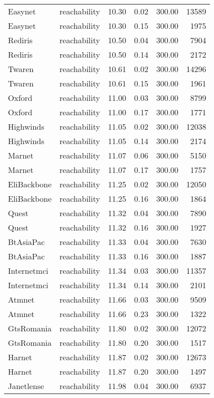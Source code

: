 \begin{tabular}{llrrrr}
Easynet & reachability & 10.30 & 0.02 & 300.00 & 13589 \\
Easynet & reachability & 10.30 & 0.15 & 300.00 & 1975 \\
Rediris & reachability & 10.50 & 0.04 & 300.00 & 7904 \\
Rediris & reachability & 10.50 & 0.14 & 300.00 & 2172 \\
Twaren & reachability & 10.61 & 0.02 & 300.00 & 14296 \\
Twaren & reachability & 10.61 & 0.15 & 300.00 & 1961 \\
Oxford & reachability & 11.00 & 0.03 & 300.00 & 8799 \\
Oxford & reachability & 11.00 & 0.17 & 300.00 & 1771 \\
Highwinds & reachability & 11.05 & 0.02 & 300.00 & 12038 \\
Highwinds & reachability & 11.05 & 0.14 & 300.00 & 2174 \\
Marnet & reachability & 11.07 & 0.06 & 300.00 & 5150 \\
Marnet & reachability & 11.07 & 0.17 & 300.00 & 1757 \\
EliBackbone & reachability & 11.25 & 0.02 & 300.00 & 12050 \\
EliBackbone & reachability & 11.25 & 0.16 & 300.00 & 1864 \\
Quest & reachability & 11.32 & 0.04 & 300.00 & 7890 \\
Quest & reachability & 11.32 & 0.16 & 300.00 & 1927 \\
BtAsiaPac & reachability & 11.33 & 0.04 & 300.00 & 7630 \\
BtAsiaPac & reachability & 11.33 & 0.16 & 300.00 & 1887 \\
Internetmci & reachability & 11.34 & 0.03 & 300.00 & 11357 \\
Internetmci & reachability & 11.34 & 0.14 & 300.00 & 2101 \\
Atmnet & reachability & 11.66 & 0.03 & 300.00 & 9509 \\
Atmnet & reachability & 11.66 & 0.23 & 300.00 & 1322 \\
GtsRomania & reachability & 11.80 & 0.02 & 300.00 & 12072 \\
GtsRomania & reachability & 11.80 & 0.20 & 300.00 & 1517 \\
Harnet & reachability & 11.87 & 0.02 & 300.00 & 12673 \\
Harnet & reachability & 11.87 & 0.20 & 300.00 & 1497 \\
Janetlense & reachability & 11.98 & 0.04 & 300.00 & 6937 \\

\end{tabular}
